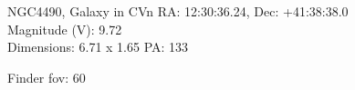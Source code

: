 \begin{block}{NGC4490, Galaxy in CVn}
    RA: 12:30:36.24, Dec: +41:38:38.0 \\ 
    Magnitude (V): 9.72 \\ 
    Dimensions: 6.71 x 1.65 PA: 133 

    Finder fov: 60 
\end{block}
